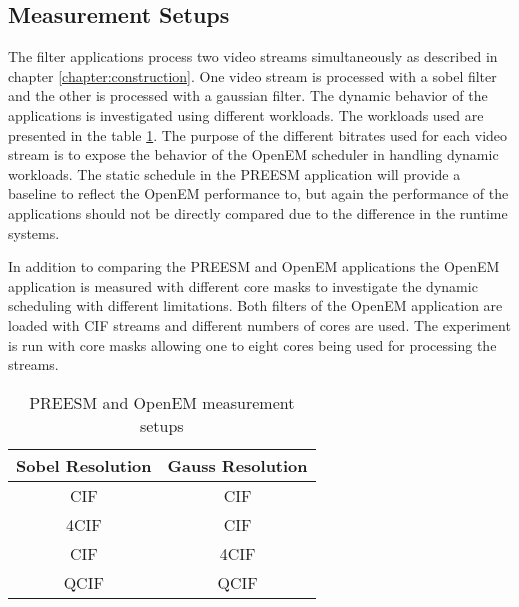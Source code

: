 \subsection{Measurement Setups}
The filter applications process two video streams simultaneously as described in chapter \ref{chapter:construction}. One video stream is processed with a sobel filter and the other is processed with a gaussian filter. The dynamic behavior of the applications is investigated using different workloads. The workloads used are presented in the table \ref{tab:preesm_setups}. The purpose of the different bitrates used for each video stream is to expose the behavior of the OpenEM scheduler in handling dynamic workloads. The static schedule in the PREESM application will provide a baseline to reflect the OpenEM performance to, but again the performance of the applications should not be directly compared due to the difference in the runtime systems.

In addition to comparing the PREESM and OpenEM applications the OpenEM application is measured with different core masks to investigate the dynamic scheduling with different limitations. Both filters of the OpenEM application are loaded with CIF streams and different numbers of cores are used. The experiment is run with core masks allowing one to eight cores being used for processing the streams.


\begin{table}
    \begin{center}
        \begin{tabular}{ c c }
            Sobel Resolution & Gauss Resolution \\ \hline
            CIF              & CIF              \\ \hline
            4CIF             & CIF              \\ \hline
            CIF              & 4CIF             \\ \hline
            QCIF             & QCIF             \\ \hline
        \end{tabular}
        \caption{PREESM and OpenEM measurement setups}
        \label{tab:preesm_setups}
    \end{center}
\end{table}
